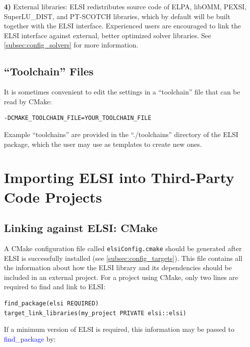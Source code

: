 \documentclass{report}
\begin{document}
\textbf{4)} External libraries:  ELSI redistributes source code of ELPA, libOMM, PEXSI, SuperLU\_DIST, and PT-SCOTCH libraries, which by default will be built together with the ELSI interface.  Experienced users are encouraged to link the ELSI interface against external, better optimized solver libraries.  See \ref{subsec:config_solvers} for more information.\\

\subsection{``Toolchain'' Files}
\label{subsec:config_toolchain}
It is sometimes convenient to edit the settings in a ``toolchain'' file that can be read by CMake:\\

\begin{verbatim}
-DCMAKE_TOOLCHAIN_FILE=YOUR_TOOLCHAIN_FILE
\end{verbatim}

Example ``toolchains'' are provided in the ``./toolchains'' directory of the ELSI package, which the user may use as templates to create new ones.\\

\section{Importing ELSI into Third-Party Code Projects}
\label{sec:import}
\subsection{Linking against ELSI:  CMake}
\label{subsec:import_cmake}
A CMake configuration file called \texttt{elsiConfig.cmake} should be generated after ELSI is successfully installed (see \ref{subsec:config_targets}).  This file contains all the information about how the ELSI library and its dependencies should be included in an external project.  For a project using CMake, only two lines are required to find and link to ELSI:\\

\begin{verbatim}
find_package(elsi REQUIRED)
target_link_libraries(my_project PRIVATE elsi::elsi)
\end{verbatim}

If a minimum version of ELSI is required, this information may be passed to \textcolor{blue}{find\_package} by:\\
\end{document}
